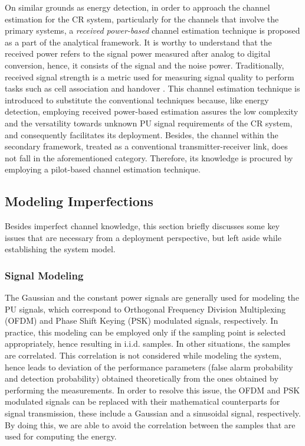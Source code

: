 On similar grounds as energy detection, in order to approach the channel estimation for the CR system, particularly for the channels that involve the primary systems, a \textit{received power-based}
channel estimation technique is proposed as a part of the analytical framework. It is worthy to understand that the received power refers to the signal power measured after analog to digital conversion, hence, it consists of the signal and the noise power. Traditionally, received signal strength is a metric used for measuring signal quality to perform tasks such as cell association and handover \cite{Boga16}. This channel estimation technique is introduced to substitute the conventional techniques because, like energy detection, employing received power-based estimation assures the low complexity and the versatility towards unknown PU signal requirements of the CR system, and consequently facilitates its deployment. Besides, the channel within the secondary framework, treated as a conventional transmitter-receiver link, does not fall in the aforementioned category. Therefore, its knowledge is procured by employing a pilot-based channel estimation technique.



\subsection{Modeling Imperfections}
Besides imperfect channel knowledge, this section briefly discusses some key issues that are necessary from a deployment perspective, but left aside while establishing the system model. 

\subsubsection{Signal Modeling}
The Gaussian and the constant power signals are generally used for modeling the PU signals, which correspond to Orthogonal Frequency Division Multiplexing (OFDM) and Phase Shift Keying (PSK) modulated signals, respectively. In practice, this modeling can be employed only if the sampling point is selected appropriately, hence resulting in i.i.d. samples. In other situations, the samples are correlated.
This correlation is not considered while modeling the system, hence leads to deviation of the performance parameters (false alarm probability and detection probability) obtained theoretically from the ones obtained by performing the measurements. In order to resolve this issue, the OFDM and PSK modulated signals can be replaced with their mathematical counterparts for signal transmission, these include a Gaussian and a sinusoidal signal, respectively. By doing this, we are able to avoid the correlation between the samples that are used for computing the energy.

